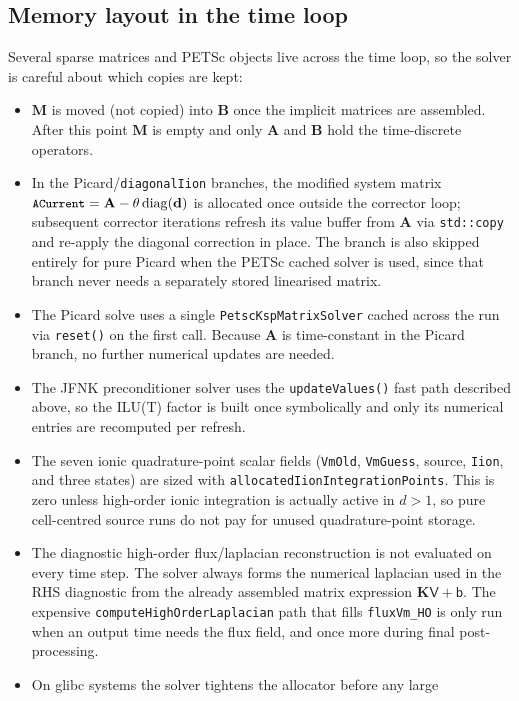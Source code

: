 \documentclass[11pt,a4paper]{article}
\newcommand{\code}[1]{\texttt{\small #1}}
\newcommand{\Mmass}{\mathbf{M}}
\newcommand{\Kstif}{\mathbf{K}}
\newcommand{\Aimp}{\mathbf{A}}
\newcommand{\Bimp}{\mathbf{B}}
\begin{document}
\subsection{Memory layout in the time loop}
\label{sec:memory-loop}

Several sparse matrices and PETSc objects live across the time loop, so the
solver is careful about which copies are kept:
\begin{itemize}
\item $\Mmass$ is moved (not copied) into $\Bimp$ once the implicit matrices
are assembled. After this point $\Mmass$ is empty and only $\Aimp$ and $\Bimp$
hold the time-discrete operators.
\item In the Picard/\code{diagonalIion} branches, the modified system matrix
$\code{ACurrent}=\Aimp-\theta\,\mathrm{diag}(\mathbf{d})$ is allocated once
outside the corrector loop; subsequent corrector iterations refresh its value
buffer from $\Aimp$ via \code{std::copy} and re-apply the diagonal correction
in place. The branch is also skipped entirely for pure Picard when the PETSc
cached solver is used, since that branch never needs a separately stored
linearised matrix.
\item The Picard solve uses a single \code{PetscKspMatrixSolver} cached
across the run via \code{reset()} on the first call. Because $\Aimp$ is
time-constant in the Picard branch, no further numerical updates are needed.
\item The JFNK preconditioner solver uses the \code{updateValues()} fast path
described above, so the ILU(T) factor is built once symbolically and only its
numerical entries are recomputed per refresh.
\item The seven ionic quadrature-point scalar fields
(\code{VmOld}, \code{VmGuess}, source, \code{Iion}, and three states) are sized
with \code{allocatedIionIntegrationPoints}. This is zero unless high-order
ionic integration is actually active in $d>1$, so pure cell-centred source
runs do not pay for unused quadrature-point storage.
\item The diagnostic high-order flux/laplacian reconstruction is not evaluated
on every time step. The solver always forms the numerical laplacian used in
the RHS diagnostic from the already assembled matrix expression
$\Kstif\mathsf{V}+\mathsf{b}$. The expensive
\code{computeHighOrderLaplacian} path that fills \code{fluxVm\_HO} is only run
when an output time needs the flux field, and once more during final
post-processing.
\item On glibc systems the solver tightens the allocator before any large

\end{itemize}
\end{document}
